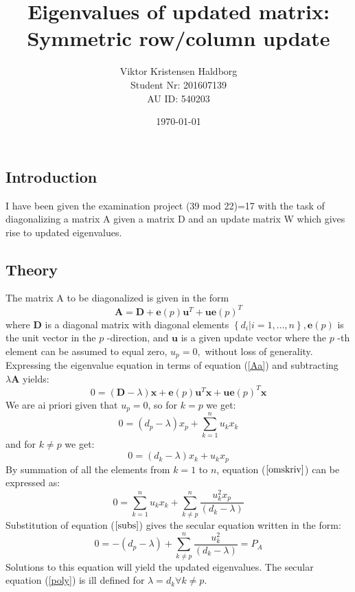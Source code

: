\documentclass{article}
\begin{document}
	\title{\textbf{Eigenvalues of updated matrix:\\
		 Symmetric row/column update}}
	\author{Viktor Kristensen Haldborg\\
		Student Nr: 201607139 \\
		AU ID: 540203}
	\date{\today}
	\maketitle	


		


\subsection*{Introduction}
I have been given the examination project (39 mod 22)=17 with the task of diagonalizing a matrix A given a matrix D and an update matrix W which gives rise to updated eigenvalues. 
\subsection*{Theory}
The matrix A to be diagonalized is given in the form
\begin{equation}
\mathbf{A}=\mathbf{D}+\mathbf{e}(p) \mathbf{u}^{T}+\mathbf{u e}(p)^{T}
\label{Aa}
\end{equation}
where $\mathbf{D}$ is a diagonal matrix with diagonal elements $\left\{d_{i} | i=1, \ldots, n\right\}, \mathbf{e}(p)$ is the unit vector in the $p$ -direction, and $\mathbf{u}$ is a given update vector where the $p$ -th element can be assumed to equal zero, $u_{p}=0,$ without loss of generality. Expressing the eigenvalue equation in terms of equation (\ref{Aa}) and subtracting $\lambda \mathbf{A}$ yields:
\begin{equation}
0=(\mathbf{D}-\lambda) \mathbf{x}+\mathbf{e}(p) \mathbf{u}^{T} \mathbf{x}+\mathbf{u e}(p)^{T} \mathbf{x}
\end{equation}
We are ai priori given that $u_{p}=0$, so for $k=p$ we get:
\begin{equation}
0=\left(d_{p}-\lambda\right) x_{p}+\sum_{k=1}^{n}u_{k}x_{k}
\label{subs}
\end{equation}
and for $k \neq p$ we get:
\begin{equation}
0=\left(d_{k}-\lambda\right) x_{k}+u_{k} x_{p}
\label{omskriv}
\end{equation}
By summation of all the elements from $k=1$ to $n$, equation ($\ref{omskriv}$) can be expressed as:
\begin{equation}
0=\sum_{k=1}^{n}u_{k}x_{k}+\sum_{k\neq p}^{n}\frac{u_{k}^{2} x_{p}}{\left(d_{k}-\lambda\right)}
\label{omskriv1}
\end{equation}
Substitution of equation ($\ref{subs}$) gives the secular equation written in the form: 
\begin{equation}
0=-\left(d_{p}-\lambda\right)+\sum_{k \neq p}^{n}\frac{u_{k}^{2}}{\left(d_{k}-\lambda\right)}=P_{A}
\label{poly}
\end{equation}
Solutions to this equation will yield the updated eigenvalues.
The secular equation (\ref{poly}) is ill defined for $\lambda=d_{k} \forall k\neq p$.
\end{document}
